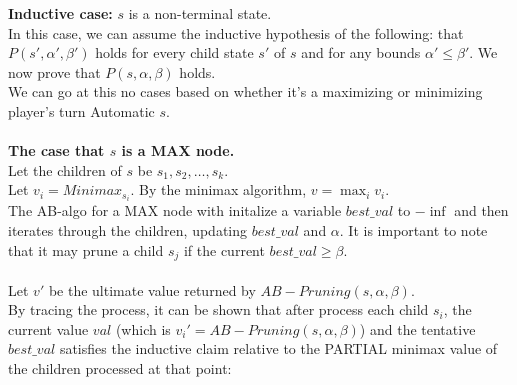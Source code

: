 \documentclass[11pt]{article}
\begin{document}
    {\noindent \textbf {Inductive case: } $s$ is a non-terminal state.}
    \\
    In this case, we can assume the inductive hypothesis of the following: that $P(s', \alpha', \beta')$ holds for every child state $s'$ of $s$ and for any bounds $\alpha' \le \beta'$. We now prove that $P(s, \alpha, \beta)$ holds. \\
    We can go at this no cases based on whether it's a maximizing or minimizing player's turn Automatic $s$.
    \\
    \\
    {\textbf {The case that $s$ is a MAX node.}}
    \\
    Let the children of $s$ be $s_1, s_2, \ldots, s_k$. \\
    Let $v_i = Minimax_{s_i}$. By the minimax algorithm, $v = \max_{i} v_{i}$. \\
    The AB-algo for a MAX node with initalize a variable $best\_val$ to $-\inf$ and then iterates through the children, updating $best\_val$ and $\alpha$. It is important to note that it may prune a child $s_j$ if the current $best\_val \ge \beta$. \\
    \\
    Let $v'$ be the ultimate value returned by $AB-Pruning(s, \alpha, \beta)$. \\
    By tracing the process, it can be shown that after process each child $s_i$, the current value $val$ (which is $v_{i}' = AB-Pruning(s, \alpha, \beta)$) and the tentative $best\_val$ satisfies the inductive claim relative to the PARTIAL minimax value of the children processed at that point:
    \\
\end{document}
